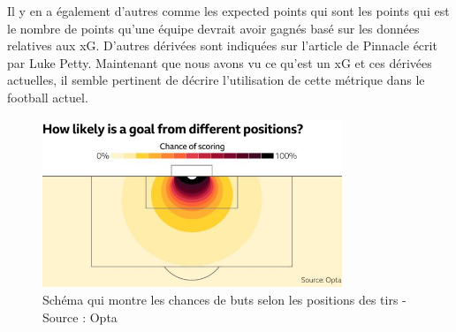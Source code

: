 \documentclass[12pt]{article}
\begin{document}
\noindent Il y en a également d'autres comme les expected points qui sont les points qui est le nombre de points qu'une équipe devrait avoir gagnés basé sur les données relatives aux xG. D'autres dérivées sont indiquées sur l'article de Pinnacle écrit par Luke Petty. \cite{pettyWhatExpectedGoals2018a}
\newline\newline
\noindent Maintenant que nous avons vu ce qu'est un xG et ces dérivées actuelles, il semble pertinent de décrire l'utilisation de cette métrique dans le football actuel.

\begin{figure}[htp]
    \centering
    \includegraphics[width=0.8\textwidth]{img/SchemaXG.jpeg}

    \caption{Schéma qui montre les chances de buts selon les positions des tirs - Source : Opta}
    \label{fig:shotmap}
\end{figure}
\end{document}
